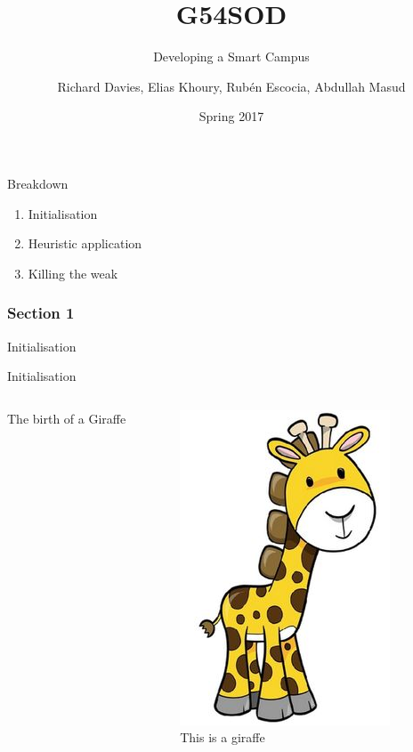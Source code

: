 \documentclass[24pt]{beamer}
\title{G54SOD}
\subtitle{Developing a Smart Campus}
\date{Spring 2017}
\author{Richard Davies, Elias Khoury, Rubén Escocia, Abdullah Masud}
\institute{The University of Nottingham}
\begin{document}
    \graphicspath{ {images/} }
    \maketitle

    \begin{frame}{Breakdown}
        \begin{enumerate}
            \item Initialisation
            \item Heuristic application
            \item Killing the weak
        \end{enumerate}
    \end{frame}

    \begin{centering}
        \begin{frame}[c]{}
            \frametitle{Section 1}
            Initialisation
        \end{frame}
    \end{centering}

    \begin{frame}{Initialisation}
        \begin{columns}
                The birth of a Giraffe
                \begin{figure}
                \includegraphics[scale=0.5]{giraffe}
                \caption{This is a giraffe}
                \end{figure}
        \end{columns}
    \end{frame}
\end{document}
